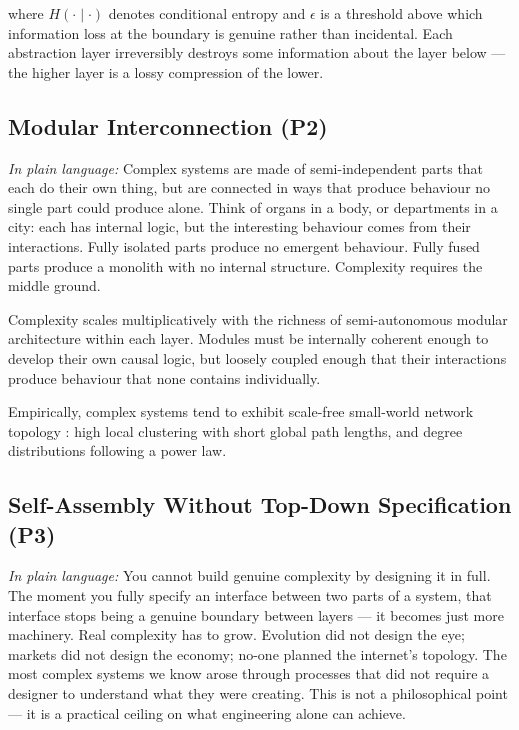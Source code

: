 \documentclass[12pt,a4paper]{article}
\begin{document}
where $H(\cdot \mid \cdot)$ denotes conditional entropy and $\epsilon$
is a threshold above which information loss at the boundary is genuine
rather than incidental.
Each abstraction layer irreversibly destroys some information about the
layer below — the higher layer is a lossy compression of the lower.

\subsection{Modular Interconnection (P2)}

\textit{In plain language:} Complex systems are made of semi-independent
parts that each do their own thing, but are connected in ways that
produce behaviour no single part could produce alone.
Think of organs in a body, or departments in a city: each has internal
logic, but the interesting behaviour comes from their interactions.
Fully isolated parts produce no emergent behaviour.
Fully fused parts produce a monolith with no internal structure.
Complexity requires the middle ground.

Complexity scales multiplicatively with the richness of semi-autonomous
modular architecture within each layer.
Modules must be internally coherent enough to develop their own causal
logic, but loosely coupled enough that their interactions produce
behaviour that none contains individually.

Empirically, complex systems tend to exhibit scale-free small-world
network topology \citep{watts1998, barabasi1999}: high local clustering
with short global path lengths, and degree distributions following a
power law.

\subsection{Self-Assembly Without Top-Down Specification (P3)}

\textit{In plain language:} You cannot build genuine complexity by
designing it in full. The moment you fully specify an interface between
two parts of a system, that interface stops being a genuine boundary
between layers — it becomes just more machinery.
Real complexity has to grow. Evolution did not design the eye; markets
did not design the economy; no-one planned the internet's topology.
The most complex systems we know arose through processes that did not
require a designer to understand what they were creating.
This is not a philosophical point — it is a practical ceiling on what
engineering alone can achieve.
\end{document}
